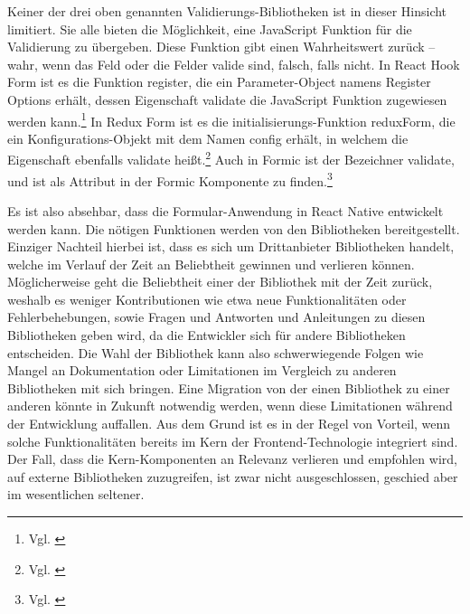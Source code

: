 Keiner der drei oben genannten Validierungs-Bibliotheken ist in dieser Hinsicht limitiert. Sie alle bieten die Möglichkeit, eine JavaScript Funktion für die Validierung zu übergeben. Diese Funktion gibt einen Wahrheitswert zurück – wahr, wenn das Feld oder die Felder valide sind, falsch, falls nicht. In React Hook Form ist es die Funktion register, die ein Parameter-Object namens Register Options erhält, dessen Eigenschaft validate die JavaScript Funktion zugewiesen werden kann.\footnote{Vgl. \cite{RegisterReactHookFormAPI}}
In Redux Form ist es die initialisierungs-Funktion reduxForm, die ein Konfigurations-Objekt mit dem Namen config erhält, in welchem die Eigenschaft ebenfalls validate heißt.\footnote{Vgl. \cite{ReduxFormReduxFormAPI}}
Auch in Formic ist der Bezeichner validate, und ist als Attribut in der Formic Komponente  zu finden.\footnote{Vgl. \cite{FormikComponentFormikDocsAPI}}


Es ist also absehbar, dass die Formular-Anwendung in React Native entwickelt werden kann. Die nötigen Funktionen werden von den Bibliotheken bereitgestellt. Einziger Nachteil hierbei ist, dass es sich um Drittanbieter Bibliotheken handelt, welche im Verlauf der Zeit an Beliebtheit gewinnen und verlieren können. Möglicherweise geht die Beliebtheit einer der Bibliothek mit der Zeit zurück, weshalb es weniger Kontributionen wie etwa neue Funktionalitäten oder Fehlerbehebungen, sowie Fragen und Antworten  und Anleitungen zu diesen Bibliotheken geben wird, da die Entwickler sich für andere Bibliotheken entscheiden. Die Wahl der Bibliothek kann also schwerwiegende Folgen wie Mangel an Dokumentation oder Limitationen im Vergleich zu anderen Bibliotheken mit sich bringen. Eine Migration von der einen Bibliothek zu einer anderen könnte in Zukunft notwendig werden, wenn diese Limitationen während der Entwicklung auffallen. Aus dem Grund ist es in der Regel von Vorteil, wenn solche Funktionalitäten bereits im Kern der Frontend-Technologie integriert sind. Der Fall, dass die Kern-Komponenten an Relevanz verlieren und empfohlen wird, auf externe Bibliotheken zuzugreifen, ist zwar nicht ausgeschlossen, geschied aber im wesentlichen seltener.



















